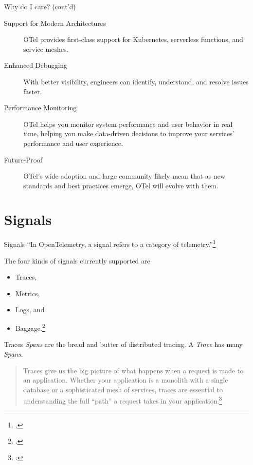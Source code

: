 \documentclass[aspectratio=169]{beamer}
\begin{document}
\begin{frame}{Why do I care? (cont'd)}
  \begin{description}
    \item[Support for Modern Architectures] OTel provides first-class support
      for Kubernetes, serverless functions, and service meshes.
    \item[Enhanced Debugging] With better visibility, engineers can identify,
      understand, and resolve issues faster.
    \item[Performance Monitoring] OTel helps you monitor system performance and
      user behavior in real time, helping you make data-driven decisions to
      improve your services' performance and user experience.
    \item[Future-Proof] OTel's wide adoption and large community likely mean
      that as new standards and best practices emerge, OTel will evolve with them.
  \end{description}
\end{frame}

\section{Signals}

\begin{frame}{Signals}
  ``In OpenTelemetry, a signal refers to a category of telemetry.''\footcite{otel-signals}

  \vspace{1em}

  The four kinds of signals currently supported are

  \begin{itemize}
    \item Traces,
    \item Metrics,
    \item Logs, and
    \item Baggage.\footcite{otel-signals}
  \end{itemize}
\end{frame}

\begin{frame}{Traces}
  \emph{Spans} are the bread and butter of distributed tracing. A \emph{Trace}
  has many \emph{Spans}.

  \vspace{1em}

  \begin{quote}
    Traces give us the big picture of what happens when a request is made to an
    application. Whether your application is a monolith with a single database
    or a sophisticated mesh of services, traces are essential to understanding
    the full ``path'' a request takes in your application.\footcite{otel-traces}
  \end{quote}
\end{frame}
\end{document}
